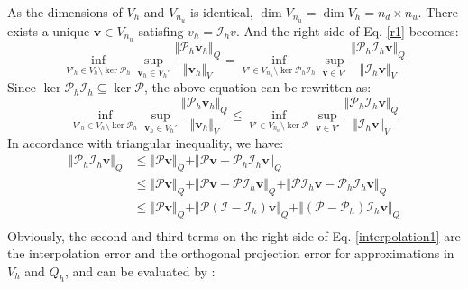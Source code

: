 \begin{pf}
    As the dimensions of $V_h$ and $V_{n_u}$ is identical, $\dim V_{n_u}=\dim V_h = n_d\times n_u$. There exists a unique $\boldsymbol v \in V_{n_u}$ satisfing $v_h = \mathcal I_h v$. And the right side of Eq. \eqref{r1} becomes:
\begin{equation}\label{r21}
\inf_{V'_h \in V_h\setminus \ker \mathcal P_h}\sup_{\boldsymbol v_h \in V_h'} \frac{\Vert \mathcal P_h \boldsymbol v_h \Vert_Q}{\Vert \boldsymbol v_h \Vert_V} = 
\inf_{V'\in V_{n_u}\setminus \ker \mathcal P_h \mathcal I_h}\sup_{\boldsymbol v \in V'} \frac{\Vert \mathcal P_h \mathcal I_h \boldsymbol v \Vert_Q}{\Vert \mathcal I_h \boldsymbol v \Vert_V}
\end{equation}
Since $\ker \mathcal P_h \mathcal I_h \subseteq \ker \mathcal P$, the above equation can be rewritten as:
\begin{equation}\label{r22}
\inf_{V'_h \in V_h\setminus \ker \mathcal P_h}\sup_{\boldsymbol v_h \in V_h'} \frac{\Vert \mathcal P_h \boldsymbol v_h \Vert_Q}{\Vert \boldsymbol v_h \Vert_V} \le 
\inf_{V'\in V_{n_u}\setminus \ker \mathcal P}\sup_{\boldsymbol v \in V'} \frac{\Vert \mathcal P_h \mathcal I_h \boldsymbol v \Vert_Q}{\Vert \mathcal I_h \boldsymbol v \Vert_V}
\end{equation}
In accordance with triangular inequality, we have:
\begin{equation}\label{interpolation1}
\begin{split}
    \Vert \mathcal P_h \mathcal I_h \boldsymbol v \Vert_Q &\le \Vert \mathcal P \boldsymbol v \Vert_Q + \Vert \mathcal P \boldsymbol v - \mathcal P_h \mathcal I_h \boldsymbol v \Vert_Q \\
    &\le \Vert \mathcal P \boldsymbol v \Vert_Q + \Vert \mathcal P \boldsymbol v - \mathcal P \mathcal I_h \boldsymbol v \Vert_Q + \Vert \mathcal P \mathcal I_h \boldsymbol v - \mathcal P_h \mathcal I_h \boldsymbol v \Vert_Q \\
    &\le \Vert \mathcal P \boldsymbol v \Vert_Q + \Vert \mathcal P(\mathcal I - \mathcal I_h) \boldsymbol v \Vert_Q + \Vert (\mathcal P - \mathcal P_h) \mathcal I_h \boldsymbol v \Vert_Q \\
\end{split}
\end{equation}
Obviously, the second and third terms on the right side of Eq. \eqref{interpolation1} are the interpolation error and the orthogonal projection error for approximations in $V_h$ and $Q_h$, and can be evaluated by \cite{yosida1995}:
\begin{align}

\end{align}
\end{pf}

